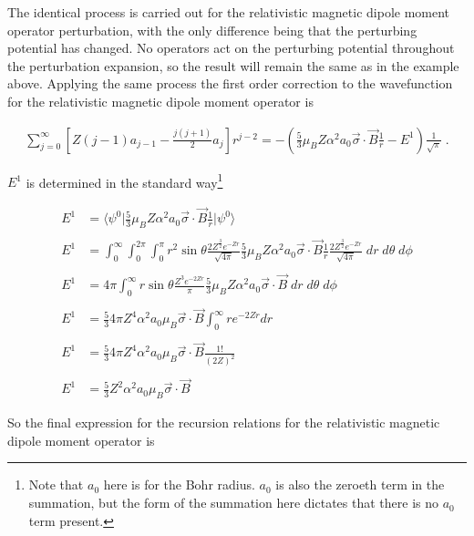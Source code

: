    The identical process is carried out for the relativistic magnetic dipole moment operator perturbation, with the only difference being that the perturbing potential has changed. No operators act on the perturbing potential throughout the perturbation expansion, so the result will remain the same as in the example above. Applying the same process the first order correction to the wavefunction for the relativistic magnetic dipole moment operator is 

    \begin{align}
        \sum_{j = 0}^\infty \left[ Z(j-1)a_{j-1} - \frac{j(j+1)}{2} a_j \right] r^{j-2} = -\left(\frac{5}{3} \mu_B Z \alpha^2 a_0 \vec{\sigma} \cdot \vec{B} \frac{1}{r} - E^1 \right) \frac{1}{\sqrt{\pi}}\;.
    \end{align}

    \noindent $E^1$ is determined in the standard way\footnote{Note that $a_0$ here is for the Bohr radius. $a_0$ is also the zeroeth term in the summation, but the form of the summation here dictates that there is no $a_0$ term present.}

    \begin{align*}
        E^1 &= \langle \psi^0 \vert \frac{5}{3} \mu_B Z \alpha^2 a_0 \vec{\sigma} \cdot \vec{B} \frac{1}{r} \vert \psi^0 \rangle \\ \nonumber \\
        E^1 &= \int_0^\infty \int_0^{2\pi} \int_0^\pi r^2 \sin \theta \frac{2Z^{\frac{3}{2}} e^{-Zr}}{\sqrt{4\pi}} \frac{5}{3} \mu_B Z \alpha^2 a_0 \vec{\sigma} \cdot \vec{B} \frac{1}{r} \frac{2Z^{\frac{3}{2}} e^{-Zr}}{\sqrt{4\pi}}\;dr\;d\theta\;d\phi  \\\nonumber \\
        E^1 &= 4\pi \int_0^\infty r \sin\theta \frac{Z^3 e^{-2Zr}}{\pi} \frac{5}{3} \mu_B Z \alpha^2 a_0 \vec{\sigma} \cdot \vec{B} \;dr\;d\theta\;d\phi\\\nonumber\\
        E^1 &= \frac{5}{3} 4\pi Z^4 \alpha^2 a_0 \mu_B \vec{\sigma} \cdot \vec{B} \int_0^\infty r e^{-2Zr} dr \\\nonumber \\
        E^1 &= \frac{5}{3} 4\pi Z^4 \alpha^2 a_0 \mu_B \vec{\sigma} \cdot \vec{B} \frac{1!}{(2Z)^2} \\\nonumber \\
        E^1 &= \frac{5}{3} Z^2 \alpha^2 a_0 \mu_B \vec{\sigma} \cdot \vec{B}
    \end{align*}

    \noindent So the final expression for the recursion relations for the relativistic magnetic dipole moment operator is 

